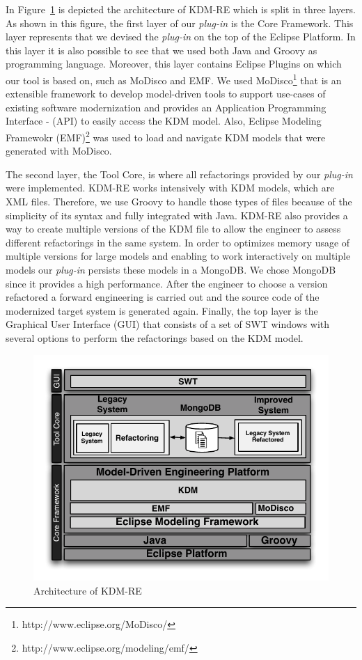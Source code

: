 In Figure~\ref{fig:architecture} is depicted the architecture of KDM-RE which is split in three layers. As shown in this figure, the first layer of our \textit{plug-in} is the Core Framework. This layer represents that  we devised the  \textit{plug-in} on the top of the Eclipse Platform. In this layer it is also possible to see that we  used both Java and Groovy as programming language. Moreover, this layer contains Eclipse Plugins on which our tool is based on, such as MoDisco and EMF. We used MoDisco\footnote{http://www.eclipse.org/MoDisco/} that is an extensible framework to develop model-driven tools to support use-cases of existing software modernization and provides an Application Programming Interface - (API) to easily access the KDM model. Also, Eclipse Modeling Framewokr (EMF)\footnote{http://www.eclipse.org/modeling/emf/} was used to load and navigate KDM models that were generated with MoDisco. 

The second layer, the Tool Core, is where all refactorings provided by our \textit{plug-in} were implemented. KDM-RE works intensively with KDM models, which are XML files. Therefore, we use Groovy to handle those types of files because of the simplicity of its syntax and fully integrated with Java. KDM-RE also provides a way to create multiple versions of the KDM file to allow the engineer  to assess different refactorings in the same system. In order to optimizes memory usage of multiple versions for large models and enabling to work interactively on multiple models our \textit{plug-in} persists these models in a MongoDB. We chose MongoDB since it provides a high performance. After the engineer to choose a version refactored a forward engineering is carried out and the source code of the modernized target system is generated again. Finally, the top layer is the Graphical User Interface (GUI) that consists of a set of SWT windows with several options to perform the refactorings based on the KDM model.


\begin{figure}[!ht]
\centering
  \includegraphics[scale=0.8]{figure/Arquitetura}
\caption{Architecture of KDM-RE}
\label{fig:architecture}
\end{figure}  
